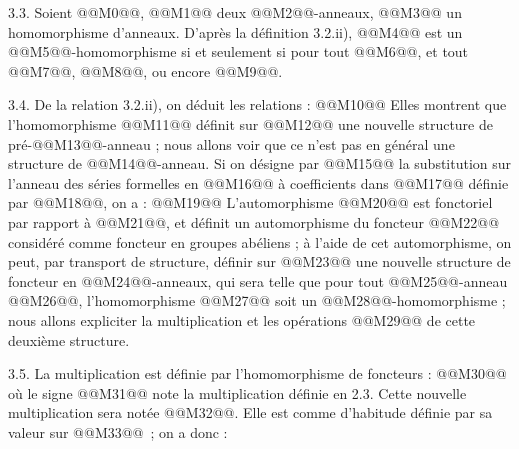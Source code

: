 
3.3.
Soient @@M0@@, @@M1@@ deux @@M2@@-anneaux, @@M3@@ un homomorphisme d'anneaux. D'après la définition 3.2.ii), @@M4@@ est un @@M5@@-homomorphisme si et seulement si pour tout @@M6@@, et tout @@M7@@, @@M8@@, ou encore @@M9@@.

3.4. De la relation 3.2.ii), on déduit les relations :
@@M10@@
Elles montrent que l'homomorphisme @@M11@@ définit sur @@M12@@ une nouvelle structure de pré-@@M13@@-anneau ; nous allons voir que ce n'est pas en général une structure de @@M14@@-anneau. Si on désigne par @@M15@@ la substitution sur l'anneau des séries formelles en @@M16@@ à coefficients dans @@M17@@ définie par @@M18@@, on a :
@@M19@@
L'automorphisme @@M20@@ est fonctoriel par rapport à @@M21@@, et définit un automorphisme du foncteur @@M22@@ considéré comme foncteur en groupes abéliens ; à l'aide de cet automorphisme, on peut, par transport de structure, définir sur @@M23@@ une nouvelle structure de foncteur en @@M24@@-anneaux, qui sera telle que pour tout @@M25@@-anneau @@M26@@, l'homomorphisme @@M27@@ soit un @@M28@@-homomorphisme ; nous allons expliciter la multiplication et les opérations @@M29@@ de cette deuxième structure.

3.5. La multiplication est définie par l'homomorphisme de foncteurs :
@@M30@@
où le signe @@M31@@ note la multiplication définie en 2.3. Cette nouvelle multiplication sera notée @@M32@@. Elle est comme d'habitude définie par sa valeur sur @@M33@@~; on a donc :
